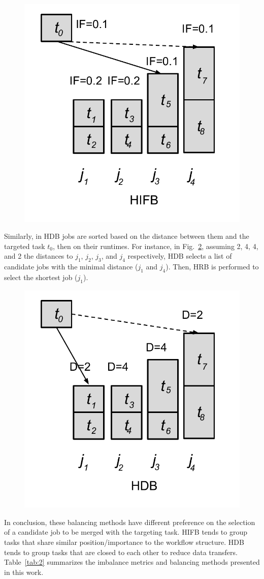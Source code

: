 \documentclass[final]{IEEEtran}
\begin{document}
\begin{figure}[htb]
	\centering
	\includegraphics[width=0.5\linewidth]{figure/algorithm_hifb.pdf}
	\label{fig:algorithm_hifb}
	\vspace{-15pt}
\end{figure}

Similarly, in HDB jobs are sorted based on the distance between them and the targeted task $t_0$, then on their runtimes. For instance, in Fig.~\ref{fig:algorithm_hdb}, assuming 2, 4, 4, and 2 the distances to $j_1$, $j_2$, $j_3$, and $j_4$ respectively, HDB selects a list of candidate jobs with the minimal distance ($j_1$ and $j_4$). Then, HRB is performed to select the shortest job ($j_1$). 

\begin{figure}[htb]
	\centering
	\includegraphics[width=0.5\linewidth]{figure/algorithm_hdb.pdf}
	\label{fig:algorithm_hdb}
	\vspace{-15pt}
\end{figure}

In conclusion, these balancing methods have different preference on the selection of a candidate job to be merged with the targeting task. HIFB tends to group tasks that share similar position/importance to the workflow structure. HDB tends to group tasks that are closed to each other to reduce data transfers. Table~\ref{tab:2} summarizes the imbalance metrics and balancing methods presented in this work. 
\end{document}
